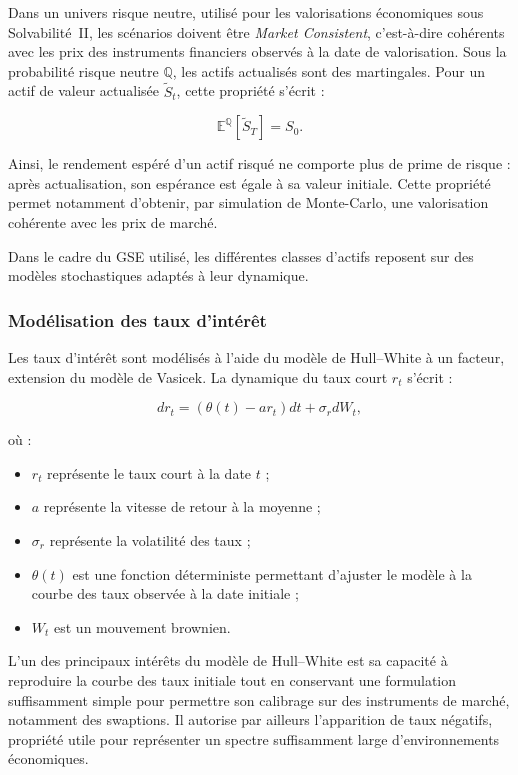 Dans un univers risque neutre, utilisé pour les valorisations économiques sous Solvabilité~II, les scénarios doivent être \textit{Market Consistent}, c'est-à-dire cohérents avec les prix des instruments financiers observés à la date de valorisation. Sous la probabilité risque neutre $\mathbb{Q}$, les actifs actualisés sont des martingales. Pour un actif de valeur actualisée $\widetilde{S}_t$, cette propriété s'écrit :

\begin{equation}
    \mathbb{E}^{\mathbb{Q}}\left[\widetilde{S}_T\right] = S_0.
\end{equation}

Ainsi, le rendement espéré d'un actif risqué ne comporte plus de prime de risque : après actualisation, son espérance est égale à sa valeur initiale. Cette propriété permet notamment d'obtenir, par simulation de Monte-Carlo, une valorisation cohérente avec les prix de marché.

Dans le cadre du GSE utilisé, les différentes classes d'actifs reposent sur des modèles stochastiques adaptés à leur dynamique.

\subsubsection*{Modélisation des taux d'intérêt}

Les taux d'intérêt sont modélisés à l'aide du modèle de Hull--White à un facteur, extension du modèle de Vasicek. La dynamique du taux court $r_t$ s'écrit :

\begin{equation}
    dr_t = \left(\theta(t)-a r_t\right)dt + \sigma_r dW_t,
\end{equation}

où :
\begin{itemize}[noitemsep,topsep=2pt]
    \item $r_t$ représente le taux court à la date $t$ ;
    \item $a$ représente la vitesse de retour à la moyenne ;
    \item $\sigma_r$ représente la volatilité des taux ;
    \item $\theta(t)$ est une fonction déterministe permettant d'ajuster le modèle à la courbe des taux observée à la date initiale ;
    \item $W_t$ est un mouvement brownien.
\end{itemize}

L'un des principaux intérêts du modèle de Hull--White est sa capacité à reproduire la courbe des taux initiale tout en conservant une formulation suffisamment simple pour permettre son calibrage sur des instruments de marché, notamment des swaptions. Il autorise par ailleurs l'apparition de taux négatifs, propriété utile pour représenter un spectre suffisamment large d'environnements économiques.


